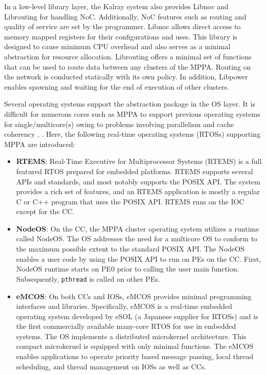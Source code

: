 In a low-level library layer, the Kalray system also provides Libnoc and Librouting for handling NoC.
Additionally, NoC features such as routing and quality of service are set by the programmer.
Libnoc allows direct access to memory mapped registers for their configurations and uses.
This library is designed to cause minimum CPU overhead and also serves as a minimal abstraction for resource allocation.
Librouting offers a minimal set of functions that can be used to route data between any clusters of the MPPA.
Routing on the network is conducted statically with its own policy.
In addition, Libpower enables spawning and waiting for the end of execution of other clusters.


Several operating systems support the abstraction package in the OS layer.
It is difficult for numerous cores such as MPPA to support previous operating systems for single/multicore(s) owing to problems involving parallelism and cache coherency \cite{Wentzlaff2009FOS}, \cite{schupbach2008embracing}.
Here, the following real-time operating systems (RTOSs) supporting MPPA are introduced:

\begin{itemize}
  \setlength{\leftskip}{-5mm}    
  \item \textbf{RTEMS}: Real-Time Executive for Multiprocessor Systems (RTEMS) is a full featured RTOS prepared for embedded platforms.
  RTEMS supports several APIs and standards, and most notably supports the POSIX API.
  The system provides a rich set of features, and an RTEMS application is mostly a regular C or C++ program that uses the POSIX API.
  RTEMS runs on the IOC except for the CC.
  
  \item \textbf{NodeOS}: On the CC, the MPPA cluster operating system utilizes a runtime called NodeOS.
  The OS addresses the need for a multicore OS to conform to the maximum possible extent to the standard POSIX API.
  The NodeOS enables a user code by using the POSIX API to run on PEs on the CC.
  First, NodeOS runtime starts on PE0 prior to calling the user main function.
  Subsequently, \texttt{pthread} is called on other PEs.
  
  \item \textbf{eMCOS}: On both CCs and IOSs, eMCOS provides minimal programming interfaces and libraries.
  Specifically, eMCOS is a real-time embedded operating system developed by eSOL (a Japanese supplier for RTOSs) and is the first commercially available many-core RTOS for use in embedded systems.
  The OS implements a distributed microkernel architecture.
  This compact microkernel is equipped with only minimal functions.
  The eMCOS enables applications to operate priority based message passing, local thread scheduling, and thread management on IOSs as well as CCs.
\end{itemize}

